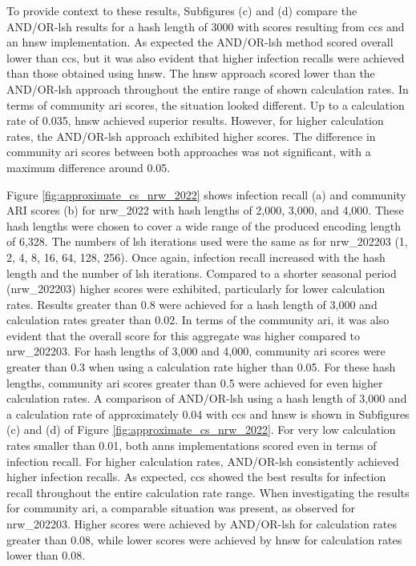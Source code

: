 To provide context to these results, Subfigures (c) and (d) compare
the AND/OR-\acrshort{lsh} results for a hash length of 3000 with scores resulting from \acrshort{ccs} and an \acrshort{hnsw} implementation. As expected the AND/OR-\acrshort{lsh} method scored overall lower than \acrshort{ccs}, but it was also evident that higher infection recalls were achieved than those obtained using \acrshort{hnsw}. The \acrshort{hnsw} approach scored lower than the AND/OR-\acrshort{lsh} approach throughout the entire range of shown calculation rates.
In terms of community \acrshort{ari} scores, the situation looked different. Up to a calculation rate of 0.035, \acrshort{hnsw} achieved superior results. However, for higher calculation rates, the AND/OR-\acrshort{lsh} approach exhibited higher scores. The difference in community \acrshort{ari} scores between both approaches was not significant, with a maximum difference around 0.05.

Figure \ref{fig:approximate_cs_nrw_2022} shows infection recall (a) and community ARI scores (b) for nrw\_2022 with hash lengths of 2,000, 3,000, and 4,000. These hash lengths were chosen to cover a wide range of the produced encoding length of 6,328. The numbers of \acrshort{lsh} iterations used were the same as for nrw\_202203 (1, 2, 4, 8, 16, 64, 128, 256). Once again, infection recall increased with the hash length and the number of \acrshort{lsh} iterations. Compared to a shorter seasonal period (nrw\_202203) higher scores were exhibited, particularly for lower calculation rates. Results greater than 0.8 were achieved for a hash length of 3,000 and calculation rates greater than 0.02.
In terms of the community \acrshort{ari}, it was also evident that the overall score for this aggregate was higher compared to nrw\_202203. For hash lengths of 3,000 and 4,000, community \acrshort{ari} scores were greater than 0.3 when using a calculation rate higher than 0.05. For these hash lengths, community \acrshort{ari} scores greater than 0.5 were achieved for even higher calculation rates.
A comparison of AND/OR-\acrshort{lsh} using a hash length of 3,000 and a calculation rate of approximately 0.04 with \acrshort{ccs} and \acrshort{hnsw} is shown in Subfigures (c) and (d) of Figure \ref{fig:approximate_cs_nrw_2022}. For very low calculation rates smaller than 0.01, both \acrshort{anns} implementations scored even in terms of infection recall. For higher calculation rates, AND/OR-\acrshort{lsh} consistently achieved higher infection recalls. As expected, \acrshort{ccs} showed the best results for infection recall throughout the entire calculation rate range. 
When investigating the results for community \acrshort{ari}, a comparable situation was present, as observed for nrw\_202203. Higher scores were achieved by AND/OR-\acrshort{lsh} for calculation rates greater than 0.08, while lower scores were achieved by \acrshort{hnsw} for calculation rates lower than 0.08.

